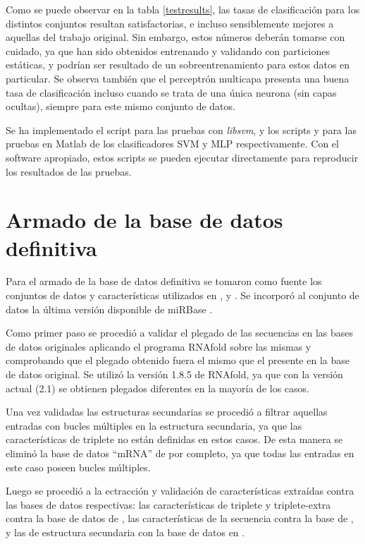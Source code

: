 \documentclass[12pt,bibliography=oldstyle,DIV=12,parskip=half-,titlepage]{scrartcl}
\begin{document}
Como se puede observar en la tabla \ref{testresults}, las tasas de
clasificación para los distintos conjuntos resultan satisfactorias, e
incluso sensiblemente mejores a aquellas del trabajo original.  Sin
embargo, estos números deberán tomarse con cuidado, ya que han sido
obtenidos entrenando y validando con particiones estáticas, y podrían
ser resultado de un sobreentrenamiento para estos datos en
particular. Se observa también que el perceptrón multicapa presenta
una buena tasa de clasificación incluso cuando se trata de una única
neurona (sin capas ocultas), siempre para este mismo conjunto de
datos.

Se ha implementado el script  para las
pruebas con \emph{libsvm}, y los scripts  y
 para las pruebas en Matlab de los clasificadores
SVM y MLP respectivamente. Con el software apropiado, estos scripts
se pueden ejecutar directamente para reproducir los resultados de las
pruebas.
%
%
%
%
%
\section{Armado de la base de datos definitiva}
Para el armado de la base de datos definitiva se tomaron como fuente
los conjuntos de datos y características utilizados en \cite{xue},
\cite{ng} y \cite{batuwita}. Se incorporó al conjunto de datos
la última versión disponible de miRBase \cite{mirbase2}.

Como primer paso se procedió a validar el plegado de las secuencias en
las bases de datos originales aplicando el programa RNAfold sobre las
mismas y comprobando que el plegado obtenido fuera el mismo que el
presente en la base de datos original. Se utilizó la versión 1.8.5 de
RNAfold, ya que con la versión actual (2.1) se obtienen plegados
diferentes en la mayoría de los casos.

Una vez validadas las estructuras secundarias se procedió a filtrar
aquellas entradas con bucles múltiples en la estructura secundaria, ya
que las características de triplete no están definidas en estos casos.
De esta manera se eliminó la base de datos ``mRNA'' de \cite{ng} por
completo, ya que todas las entradas en este caso poseen bucles
múltiples.

Luego se procedió a la ectracción y validación de características
extraídas contra las bases de datos respectivas: las características
de triplete y triplete-extra contra la base de datos de \cite{xue},
las características de la secuencia contra la base de \cite{ng}, y las
de estructura secundaria con la base de datos en \cite{batuwita}.
\end{document}
